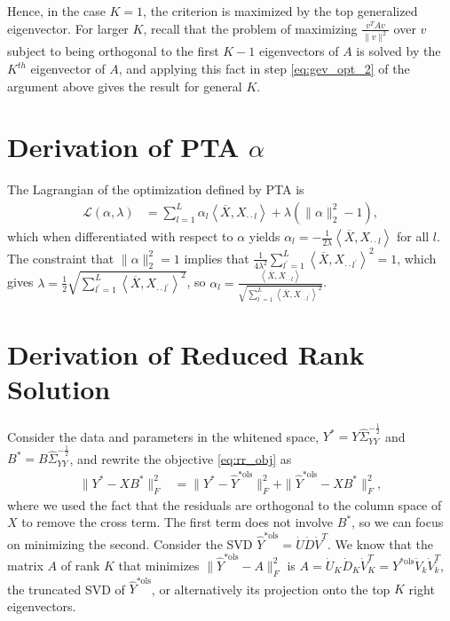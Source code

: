 Hence, in the case $K = 1$, the criterion is maximized by the top generalized
eigenvector. For larger $K$, recall that the problem of maximizing
$\frac{v^{T}Av}{\|v\|^{2}}$ over $v$ subject to being orthogonal to the first $K
- 1$ eigenvectors of $A$ is solved by the $K^{th}$ eigenvector of $A$, and
applying this fact in step \ref{eq:gev_opt_2} of the argument above gives the
result for general $K$.

\section{Derivation of PTA $\alpha$}
\label{subsec:pta_alpha_derivation}

 The Lagrangian of the optimization defined by PTA is
\begin{align*}
\mathcal{L}\left(\alpha, \lambda\right) &= \sum_{l = 1}^{L}
\alpha_{l}\left<\overline{X}, X_{\cdot\cdot l}\right> +
\lambda\left(\|\alpha\|^{2}_{2} - 1\right),
\end{align*}
which when differentiated with respect to $\alpha$ yields $\alpha_{l} =
-\frac{1}{2\lambda} \left<\overline{X}, X_{\cdot\cdot l}\right>$ for all $l$.
The constraint that $\|\alpha\|_{2}^{2} = 1$ implies that
$\frac{1}{4\lambda^{2}} \sum_{l^{\prime} = 1}^{L} \left<\overline{X},
X_{\cdot\cdot l^{\prime}}\right>^{2} = 1$, which gives $\lambda = \frac{1}{2}
\sqrt{\sum_{l^{\prime} =1 }^{L} \left<\overline{X}, X_{\cdot\cdot
    l^{\prime}}\right>^{2}}$, so $\alpha_{l} = \frac{\left<\overline{X},
  X_{\cdot\cdot l}\right>}{\sqrt{\sum_{l^{\prime} =1}^{L}\left<\overline{X},
    X_{\cdot\cdot l^{\prime}}\right>^{2}}}$.

\section{Derivation of Reduced Rank Solution}
\label{subsec:reduced_rank_derivation}

Consider the data and parameters in the whitened space, $Y^{\ast} =
Y\hat{\Sigma}_{YY}^{-\frac{1}{2}}$ and $B^{\ast} =
B\hat{\Sigma}_{YY}^{-\frac{1}{2}}$, and rewrite the objective \ref{eq:rr_obj} as
\begin{align*}
\|Y^{\ast} - XB^{\ast}\|_{F}^{2} &= \|Y^{\ast} - \hat{Y}^{\ast \text{ols}}\|_{F}^{2} + \|\hat{Y}^{\ast \text{ols}} - XB^{\ast}\|_{F}^{2},
\end{align*}
where we used the fact that the residuals are orthogonal to the column space of
$X$ to remove the cross term. The first term does not involve $B^{\ast}$, so we
can focus on minimizing the second. Consider the SVD $\hat{Y}^{\ast \text{ols}}
= \dot{U}\dot{D}\dot{V}^{T}$. We know that the matrix $A$ of rank $K$ that
minimizes $\|\hat{Y}^{\ast \text{ols}} - A\|_{F}^{2}$ is $A =
\dot{U}_{K}\dot{D}_{K}\dot{V}_{K}^{T} = Y^{\ast
  \text{ols}}\dot{V}_{k}\dot{V}_{k}^{T}$, the truncated SVD of $\hat{Y}^{\ast
  \text{ols}}$, or alternatively its projection onto the top $K$ right
eigenvectors.

